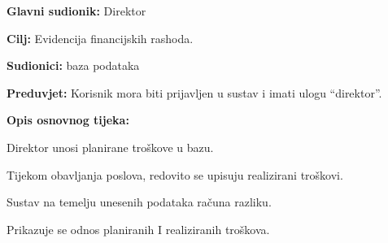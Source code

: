 			\noindent {}
			\begin{packed_item}
				\item \textbf{Glavni sudionik: } Direktor
				\item  \textbf{Cilj:} Evidencija financijskih rashoda.
				\item  \textbf{Sudionici:} baza podataka
				\item  \textbf{Preduvjet:} Korisnik mora biti prijavljen u sustav i imati ulogu “direktor”.
				\item  \textbf{Opis osnovnog tijeka:}
				\item[] \begin{packed_enum}
					\item Direktor unosi planirane troškove u bazu. 
					\item Tijekom obavljanja poslova, redovito se upisuju realizirani troškovi. 
					\item Sustav na temelju unesenih podataka računa razliku. 
					\item Prikazuje se odnos planiranih I realiziranih troškova.
				\end{packed_enum}
			\end{packed_item}
			
